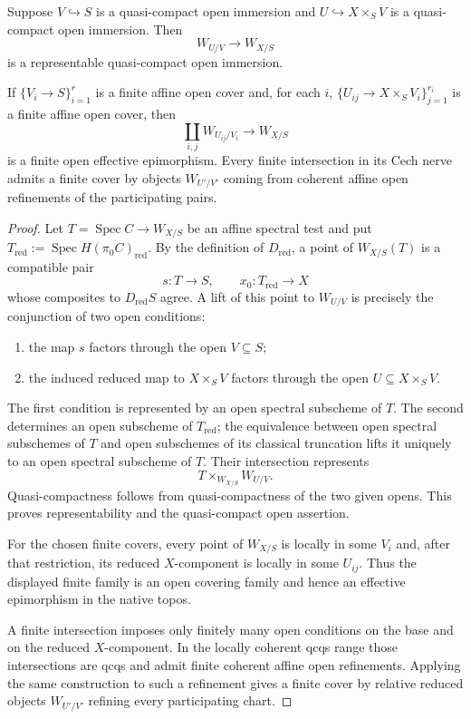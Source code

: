\begin{lemma}
\label{lem:bnli-reduced-open-charts}
Suppose $V\hookrightarrow S$ is a quasi-compact open immersion and
$U\hookrightarrow X\times_SV$ is a quasi-compact open immersion.  Then
\[
    W_{U/V}\longrightarrow W_{X/S}
\]
is a representable quasi-compact open immersion.

If $\{V_i\to S\}_{i=1}^r$ is a finite affine open cover and, for each $i$,
$\{U_{ij}\to X\times_SV_i\}_{j=1}^{r_i}$ is a finite affine open cover, then
\[
    \coprod_{i,j}W_{U_{ij}/V_i}
    \longrightarrow W_{X/S}
\]
is a finite open effective epimorphism.  Every finite intersection in its
Cech nerve admits a finite cover by objects $W_{U'/V'}$ coming from coherent
affine open refinements of the participating pairs.
\end{lemma}

\begin{proof}
Let $T=\operatorname{Spec}C\to W_{X/S}$ be an affine spectral test and put
$T_{\mathrm{red}}:=\operatorname{Spec}H(\pi_0C)_{\mathrm{red}}$.  By the
definition of $D_{\mathrm{red}}$, a point of $W_{X/S}(T)$ is a compatible
pair
\[
    s:T\to S,
    \qquad
    x_0:T_{\mathrm{red}}\to X
\]
whose composites to $D_{\mathrm{red}}S$ agree.  A lift of this point to
$W_{U/V}$ is precisely the conjunction of two open conditions:
\begin{enumerate}
    \item the map $s$ factors through the open $V\subseteq S$;
    \item the induced reduced map to $X\times_SV$ factors through the open
    $U\subseteq X\times_SV$.
\end{enumerate}
The first condition is represented by an open spectral subscheme of $T$.  The
second determines an open subscheme of $T_{\mathrm{red}}$; the equivalence
between open spectral subschemes of $T$ and open subschemes of its classical
truncation lifts it uniquely to an open spectral subscheme of $T$.  Their
intersection represents
\[
    T\times_{W_{X/S}}W_{U/V}.
\]
Quasi-compactness follows from quasi-compactness of the two given opens.  This
proves representability and the quasi-compact open assertion.

For the chosen finite covers, every point of $W_{X/S}$ is locally in some
$V_i$ and, after that restriction, its reduced $X$-component is locally in
some $U_{ij}$.  Thus the displayed finite family is an open covering family
and hence an effective epimorphism in the native topos.

A finite intersection imposes only finitely many open conditions on the base
and on the reduced $X$-component.  In the locally coherent qcqs range those
intersections are qcqs and admit finite coherent affine open refinements.
Applying the same construction to such a refinement gives a finite cover by
relative reduced objects $W_{U'/V'}$ refining every participating chart.
\end{proof}

